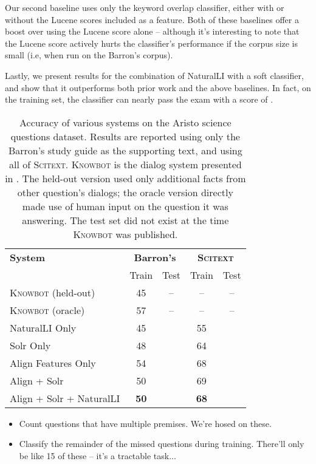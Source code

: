 Our second baseline uses only the keyword overlap classifier, either with or without
  the Lucene scores included as a feature.
Both of these baselines offer a boost over using the Lucene score alone -- although
  it's interesting to note that the Lucene score actively hurts the classifier's
  performance if the corpus size is small (i.e, when run on the Barron's corpus).

Lastly, we present results for the combination of NaturalLI with a soft classifier,
  and show that it outperforms both prior work and the above baselines.
In fact, on the training set, the classifier can nearly pass the exam with a score
  of .

%
%
\def\t#1{\small{#1}}
\def\b#1{\t{\textbf{#1}}}
\def\colspaceS{2.0mm}
\def\colspaceM{3.0mm}
\def\colspaceL{4.0mm}

\begin{table}
\begin{center}
\begin{tabular}{l@{\hskip \colspaceL}c@{\hskip \colspaceS}c@{\hskip \colspaceL}c@{\hskip \colspaceS}c}
\hline
\textbf{System} & \multicolumn{2}{c}{\textbf{Barron's}} & \multicolumn{2}{c}{\textbf{\textsc{Scitext}}} \\
 & Train & Test & Train & Test \\
\hline
\t{\textsc{Knowbot} (held-out)} & \t{45} & \t{--} & \t{--} & \t{--} \\
\t{\textsc{Knowbot} (oracle)}   & \t{57} & \t{--} & \t{--} & \t{--} \\
\hline                                                         
\t{NaturalLI Only}              & \t{45} & \t{  } & \t{55} & \t{ } \\
\t{Solr Only}                   & \t{48} & \t{  } & \t{64} & \t{ } \\
\t{Align Features Only}         & \t{54} & \t{  } & \t{68} & \t{ } \\
\t{Align + Solr}                & \t{50} & \t{  } & \t{69} & \t{ } \\
\t{Align + Solr + NaturalLI}    & \b{50} & \b{  } & \b{68} & \b{ } \\
\hline
\end{tabular}
\end{center}
\caption{
\label{tab:aristonaturalli}
Accuracy of various systems on the Aristo science questions dataset.
Results are reported using only the Barron's study guide as the supporting
  text, and using all of \textsc{Scitext}.
\textsc{Knowbot} is the dialog system presented in .
The held-out version used only additional facts from other question's dialogs;
  the oracle version directly made use of human input on the question it was 
  answering.
The test set did not exist at the time \textsc{Knowbot} was published.
}
\end{table}
%
%

\dome
\begin{itemize}
\item Count questions that have multiple premises. We're hosed on these.
\item Classify the remainder of the missed questions during training.
      There'll only be like 15 of these -- it's a tractable task...
\end{itemize}
